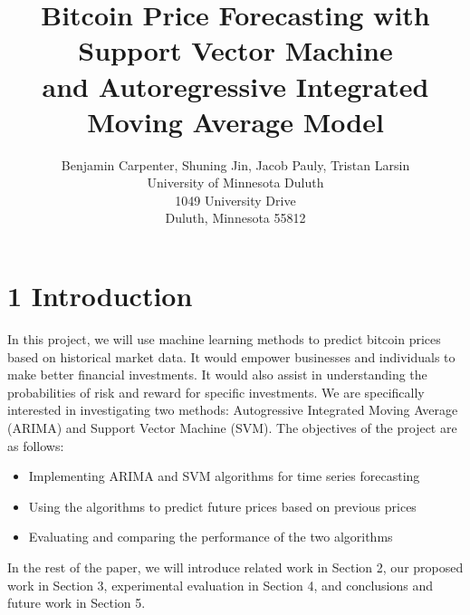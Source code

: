 \documentclass[letterpaper]{article} %
\begin{document}
%
\title{Bitcoin Price Forecasting with Support Vector Machine \\and Autoregressive Integrated Moving Average Model}
\author{Benjamin Carpenter, Shuning Jin, Jacob Pauly, Tristan Larsin\\
University of Minnesota Duluth\\ %
1049 University Drive\\
Duluth, Minnesota 55812\\
}
\maketitle




\section{1 Introduction}

In this project, we will use machine learning methods to predict bitcoin prices based on historical market data. It would empower businesses and individuals to make better financial investments. It would also assist in understanding the probabilities of risk and reward for specific investments. We are specifically interested in investigating two methods: Autogressive Integrated Moving Average (ARIMA) and Support Vector Machine (SVM). The objectives of the project are as follows:
\begin{itemize}
\item Implementing ARIMA and SVM algorithms for time series forecasting
\item Using the algorithms to predict future prices based on previous prices
\item Evaluating and comparing the performance of the two algorithms
\end{itemize}
In the rest of the paper, we will introduce related work in Section 2, our proposed work in Section 3, experimental evaluation in Section 4, and conclusions and future work in Section 5.
\end{document}
